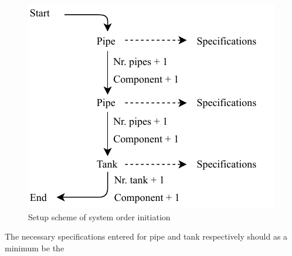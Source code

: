 \begin{figure}[H]
\centering
\includegraphics[width=0.55 \textwidth]{report/simulation/pictures/sys_setup.pdf}
\caption{Setup scheme of system order initiation}
\label{fig:sys_setup}
\end{figure}

The necessary specifications entered for pipe and tank respectively should as a minimum be the      